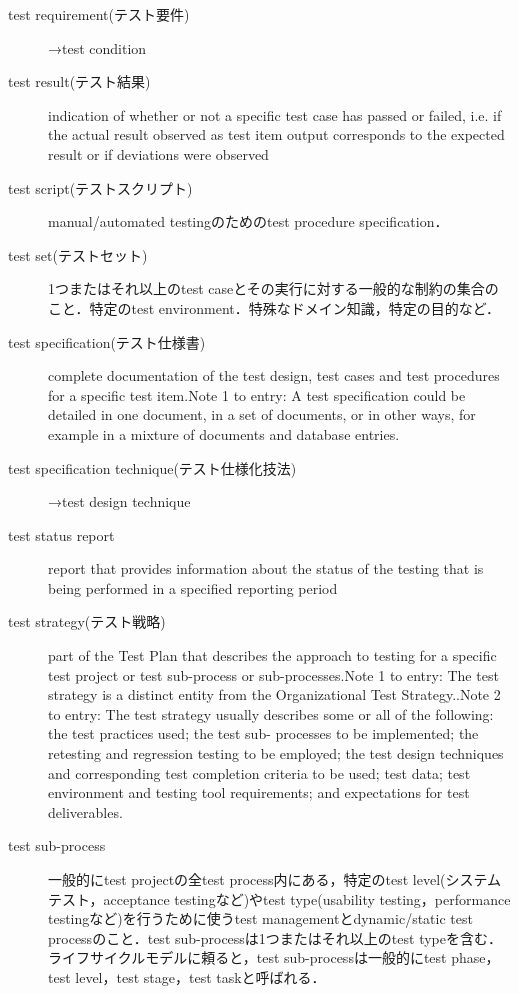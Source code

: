 \begin{description}
    \item[test requirement(テスト要件)]→test condition
    \item[test result(テスト結果)]indication of whether or not a specific test case has passed or failed, i.e. if the actual result observed as test item output corresponds to the expected result or if deviations were observed
    \item[test script(テストスクリプト)]manual/automated testingのためのtest procedure specification．
    \item[test set(テストセット)]1つまたはそれ以上のtest caseとその実行に対する一般的な制約の集合のこと．特定のtest environment．特殊なドメイン知識，特定の目的など．
    \item[test specification(テスト仕様書)]complete documentation of the test design, test cases and test procedures for a specific test item.Note 1 to entry: A test specification could be detailed in one document, in a set of documents, or in other ways, for example in a mixture of documents and database entries.
    \item[test specification technique(テスト仕様化技法)]→test design technique
    \item[test status report]report that provides information about the status of the testing that is being performed in a specified reporting period
    \item[test strategy(テスト戦略)]part of the Test Plan that describes the approach to testing for a specific test project or test sub-process or sub-processes.Note 1 to entry: The test strategy is a distinct entity from the Organizational Test Strategy..Note 2 to entry: The test strategy usually describes some or all of the following: the test practices used; the test sub- processes to be implemented; the retesting and regression testing to be employed; the test design techniques and corresponding test completion criteria to be used; test data; test environment and testing tool requirements; and expectations for test deliverables.
    \item[test sub-process]一般的にtest projectの全test process内にある，特定のtest level(システムテスト，acceptance testingなど)やtest type(usability testing，performance testingなど)を行うために使うtest managementとdynamic/static test processのこと．test sub-processは1つまたはそれ以上のtest typeを含む．ライフサイクルモデルに頼ると，test sub-processは一般的にtest phase，test level，test stage，test taskと呼ばれる．

\end{description}

